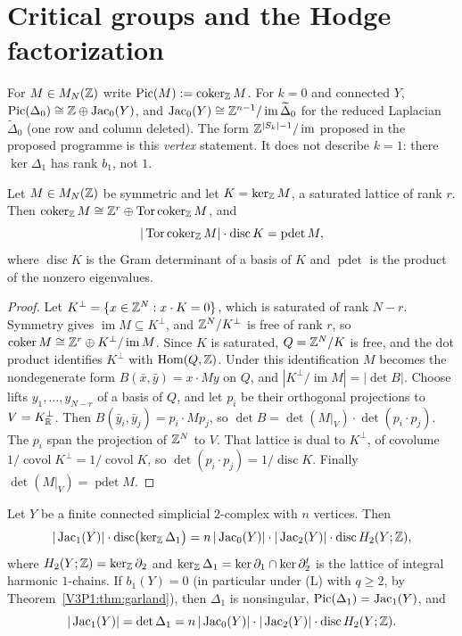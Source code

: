 \section{Critical groups and the Hodge factorization}\label{V3P2:sec:hodge}

For $M\in M_N(\mathbb{Z})$ write $\operatorname{Pic}(M):=\operatorname{coker}_{\mathbb{Z}} M$. For $k=0$ and connected $Y$,
$\operatorname{Pic}(\Delta_0)\cong\mathbb{Z}\oplus\operatorname{Jac}_0(Y)$, and
$\operatorname{Jac}_0(Y)\cong\mathbb{Z}^{n-1}/\operatorname{im}\widetilde\Delta_0$ for the reduced Laplacian
$\widetilde\Delta_0$ (one row and column deleted). The form $\mathbb{Z}^{|S_k|-1}/\operatorname{im}$
proposed in the proposed programme is this \emph{vertex} statement. It does not describe $k=1$:
there $\ker\Delta_1$ has rank $b_1$, not $1$.

\begin{lemma}\label{V3P2:lem:lattice}
Let $M\in M_N(\mathbb{Z})$ be symmetric and let $K=\ker_{\mathbb{Z}} M$, a saturated lattice of rank $r$. Then
$\operatorname{coker}_{\mathbb{Z}} M\cong\mathbb{Z}^{r}\oplus\operatorname{Tor}\operatorname{coker}_{\mathbb{Z}} M$, and
\[
|\operatorname{Tor}\operatorname{coker}_{\mathbb{Z}} M|\cdot\operatorname{disc}K=\operatorname{pdet}M,
\]
where $\operatorname{disc}K$ is the Gram determinant of a basis of $K$ and
$\operatorname{pdet}$ is the product of the nonzero eigenvalues.
\end{lemma}

\begin{proof}
Let $K^{\perp}=\{x\in\mathbb{Z}^{N}:x\cdot K=0\}$, which is saturated of rank $N-r$. Symmetry gives
$\operatorname{im}M\subseteq K^{\perp}$, and $\mathbb{Z}^{N}/K^{\perp}$ is free of rank $r$, so
$\operatorname{coker} M\cong\mathbb{Z}^{r}\oplus K^{\perp}/\operatorname{im}M$. Since $K$ is saturated,
$Q=\mathbb{Z}^{N}/K$ is free, and the dot product identifies $K^{\perp}$ with
$\operatorname{Hom}(Q,\mathbb{Z})$. Under this identification $M$ becomes the nondegenerate form
$B(\bar x,\bar y)=x\cdot My$ on $Q$, and $|K^{\perp}/\operatorname{im}M|=|\det B|$. Choose
lifts $y_1,\dots,y_{N-r}$ of a basis of $Q$, and let $p_i$ be their orthogonal projections to
$V=K_{\mathbb{R}}^{\perp}$. Then $B(\bar y_i,\bar y_j)=p_i\cdot Mp_j$, so
$\det B=\det(M|_V)\cdot\det(p_i\cdot p_j)$. The $p_i$ span the projection of $\mathbb{Z}^{N}$ to $V$.
That lattice is dual to $K^{\perp}$, of covolume $1/\operatorname{covol}K^{\perp}
=1/\operatorname{covol}K$, so $\det(p_i\cdot p_j)=1/\operatorname{disc}K$. Finally
$\det(M|_V)=\operatorname{pdet}M$.
\end{proof}

\begin{theorem}\label{V3P2:thm:hodge}
Let $Y$ be a finite connected simplicial $2$-complex with $n$ vertices. Then
\[
|\operatorname{Jac}_1(Y)|\cdot\operatorname{disc}\bigl(\ker_{\mathbb{Z}}\Delta_1\bigr)
=n\,|\operatorname{Jac}_0(Y)|\cdot|\operatorname{Jac}_2(Y)|\cdot\operatorname{disc}H_2(Y;\mathbb{Z}),
\]
where $H_2(Y;\mathbb{Z})=\ker_{\mathbb{Z}}\partial_2$ and $\ker_{\mathbb{Z}}\Delta_1=\ker\partial_1\cap\ker\partial_2^{t}$
is the lattice of integral harmonic $1$-chains. If $b_1(Y)=0$ (in particular under
\textup{(L)} with $q\ge2$, by Theorem~\ref{V3P1:thm:garland}), then $\Delta_1$ is
nonsingular, $\operatorname{Pic}(\Delta_1)=\operatorname{Jac}_1(Y)$, and
\[
|\operatorname{Jac}_1(Y)|=\det\Delta_1=n\,|\operatorname{Jac}_0(Y)|\cdot|\operatorname{Jac}_2(Y)|\cdot\operatorname{disc}H_2(Y;\mathbb{Z}).
\]
\end{theorem}


